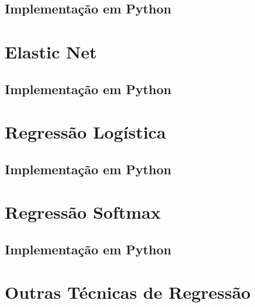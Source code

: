 \subsection{Implementação em Python}

\section{Elastic Net}

\subsection{Implementação em Python}

\section{Regressão Logística}

\subsection{Implementação em Python}

\section{Regressão Softmax}

\subsection{Implementação em Python}

\section{Outras Técnicas de Regressão}

